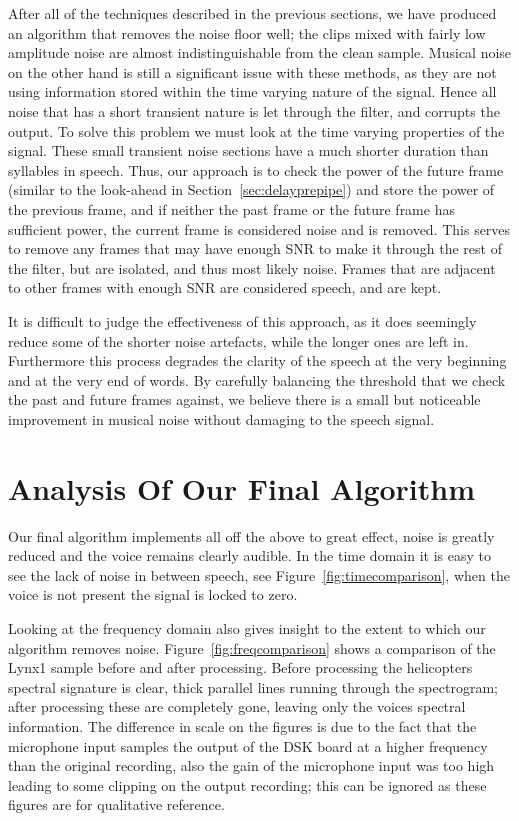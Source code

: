 \documentclass[11pt]{article} %
\begin{document}
{After all of the techniques described in the previous sections, we have produced an algorithm that removes the noise floor well; the clips mixed with fairly low amplitude noise are almost indistinguishable from the clean sample. Musical noise on the other hand is still a significant issue with these methods, as they are not using information stored within the time varying nature of the signal. Hence all noise that has a short transient nature is let through the filter, and corrupts the output.
To solve this problem we must look at the time varying properties of the signal. These small transient noise sections have a much shorter duration than syllables in speech. Thus, our approach is to check the power of the future frame (similar to the look-ahead in Section~\ref{sec:delayprepipe}) and store the power of the previous frame, and if neither the past frame or the future frame has sufficient power, the current frame is considered noise and is removed. This serves to remove any frames that may have enough SNR to make it through the rest of the filter, but are isolated, and thus most likely noise. Frames that are adjacent to other frames with enough SNR are considered speech, and are kept. 

It is difficult to judge the effectiveness of this approach, as it does seemingly reduce some of the shorter noise artefacts, while the longer ones are left in. 
Furthermore this process degrades the clarity of the speech at the very beginning and at the very end of words. By carefully balancing the threshold that we check the past and future frames against, we believe there is a small but noticeable improvement in musical noise without damaging to the speech signal. 

\clearpage

\section{Analysis Of Our Final Algorithm} 
Our final algorithm implements all off the above to great effect, noise is greatly reduced and the voice remains clearly audible. In the time domain it is easy to see the lack of noise in between speech, see Figure~\ref{fig:timecomparison}, when the voice is not present the signal is locked to zero. 

Looking at the frequency domain also gives insight to the extent to which our algorithm removes noise. Figure~\ref{fig:freqcomparison} shows a comparison of the Lynx1 sample before and after processing. Before processing the helicopters spectral signature is clear, thick parallel lines running through the spectrogram; after processing these are completely gone, leaving only the voices spectral information. The difference in scale on the figures is due to the fact that the microphone input samples the output of the DSK board at a higher frequency than the original recording, also the gain of the microphone input was too high leading to some clipping on the output recording; this can be ignored as these figures are for qualitative reference.    

}
\end{document}
